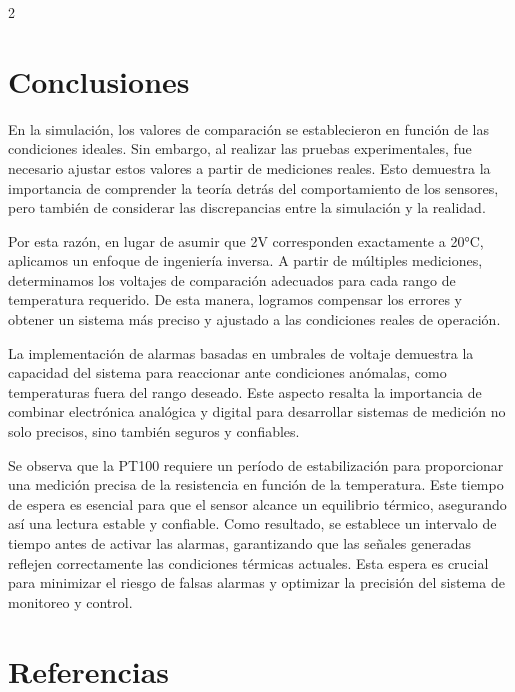 \documentclass{article}
\begin{document}
\begin{multicols}{2}
\section{Conclusiones}
\vspace{0.2cm}

En la simulación, los valores de comparación se establecieron en función de las condiciones ideales. Sin embargo, al realizar las pruebas experimentales, fue necesario ajustar estos valores a partir de mediciones reales. Esto demuestra la importancia de comprender la teoría detrás del comportamiento de los sensores, pero también de considerar las discrepancias entre la simulación y la realidad.

\vspace{0.2cm}

Por esta razón, en lugar de asumir que 2V corresponden exactamente a 20°C, aplicamos un enfoque de ingeniería inversa. A partir de múltiples mediciones, determinamos los voltajes de comparación adecuados para cada rango de temperatura requerido. De esta manera, logramos compensar los errores y obtener un sistema más preciso y ajustado a las condiciones reales de operación.

\vspace{0.2cm}

La implementación de alarmas basadas en umbrales de voltaje demuestra la capacidad del sistema para reaccionar ante condiciones anómalas, como temperaturas fuera del rango deseado. Este aspecto resalta la importancia de combinar electrónica analógica y digital para desarrollar sistemas de medición no solo precisos, sino también seguros y confiables.
\vspace{0.2cm}

Se observa que la PT100 requiere un período de estabilización para proporcionar una medición precisa de la resistencia en función de la temperatura. Este tiempo de espera es esencial para que el sensor alcance un equilibrio térmico, asegurando así una lectura estable y confiable. Como resultado, se establece un intervalo de tiempo antes de activar las alarmas, garantizando que las señales generadas reflejen correctamente las condiciones térmicas actuales. Esta espera es crucial para minimizar el riesgo de falsas alarmas y optimizar la precisión del sistema de monitoreo y control.

\section{Referencias}


\end{multicols}
\end{document}
